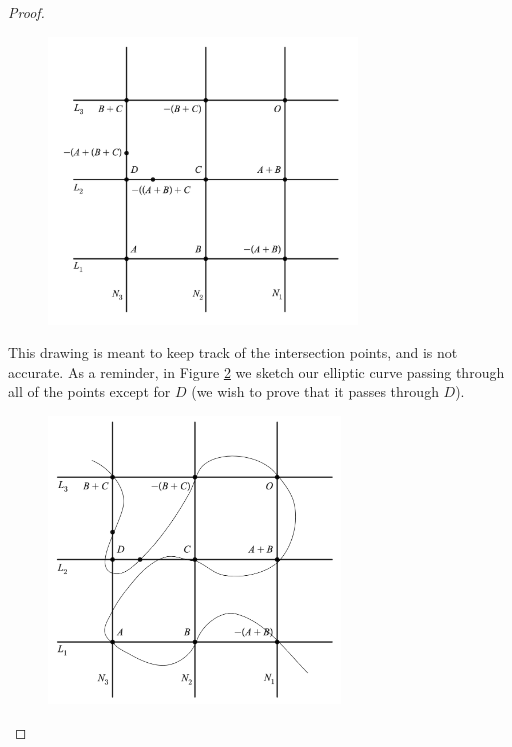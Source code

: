 \documentclass[]{math_paper}
\begin{document}
\begin{proof}
\begin{enumerate} [label = (\roman*)]
              \begin{figure}[H]
                  \centering
                  \includegraphics[height = 3in]{media/grid_1.png}
                  \label{fig:grid1}
              \end{figure}

              This drawing is meant to keep track of the intersection points, and is not accurate. As a reminder, in Figure \ref{fig:grid2} we sketch our elliptic curve passing through all of the points except for $D$ (we wish to prove that it passes through $D$).

              \begin{figure}[H]
                  \centering
                  \includegraphics[height = 3in]{media/grid_2.png}
                  \label{fig:grid2}
              \end{figure}


\end{enumerate}
\end{proof}
\end{document}
